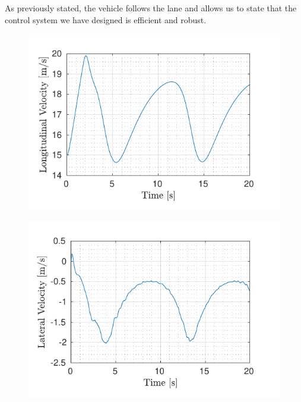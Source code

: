 As previously stated, the vehicle follows the lane and allows us to state that the control system we have designed is efficient and robust.
\begin{figure}[!h]
	\begin{minipage}[t]{0.5\textwidth}
		\includegraphics[width=\textwidth]{../../MATLAB/lane_following_circular_path/figure/LongitudinalVelocityVsTime_circular.pdf}
		\label{fig:longitudinal_velocity_laneFollowing_circular}
	\end{minipage}
	\begin{minipage}[t]{0.5\textwidth}
		\includegraphics[width=\textwidth]{../../MATLAB/lane_following_circular_path/figure/LateralVelocityVsTime_circular.pdf}

\end{minipage}
\end{figure}
